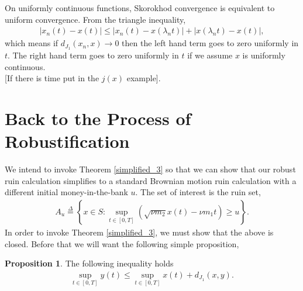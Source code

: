 \documentclass[12pt]{article}
\newcommand{\define}{\overset{\Delta}{=}}
\theoremstyle{definition}
\theoremstyle{definition}
\newtheorem{proposition}{Proposition}
\theoremstyle{definition}
\begin{document}
On uniformly continuous functions, Skorokhod convergence is equivalent to uniform convergence. From the triangle inequality, 
\begin{align*}
|x_n(t)-x(t)|\leq |x_n(t)-x(\lambda_n t)|+ |x(\lambda_n t)-x(t)|,
\end{align*}
which means if $d_{J_1}(x_n,x)\rightarrow 0$ then the left hand term goes to zero uniformly in $t$. The right hand term goes to zero uniformly in $t$ if we assume $x$ is uniformly continuous.\\

[If there is time put in the $j(x)$ example].



\clearpage
\section*{Back to the Process of Robustification}
We intend to invoke Theorem \ref{simplified_3} so that we can show that our robust ruin calculation simplifies to a standard Brownian motion ruin calculation with a different initial money-in-the-bank $u$. The set of interest is the ruin set,
\begin{align*}
A_u\define \left\{x\in S: \sup_{t\in[0,T]} \left(\sqrt{\nu m_2}x(t)-\nu m_1t\right)\geq u\right\}.
\end{align*}
In order to invoke Theorem \ref{simplified_3}, we must show that the above is closed. Before that we will want the following simple proposition,
\begin{proposition} \label{prop_counter_example} The following inequality holds
\begin{align*}
\sup_{t\in[0,T]}y(t)\leq \sup_{t\in[0,T]} x(t)+d_{J_1}(x,y).
\end{align*}
\end{proposition}
\end{document}
